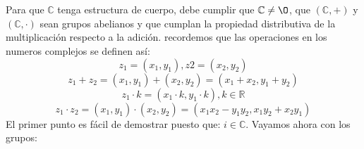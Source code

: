 \documentclass[12pt,a4paper,oneside,onecolumn]{article}
\begin{document}
    \section{}
    Para que $\mathbb{C}$ tenga estructura de cuerpo, debe cumplir que $ \mathbb{C} \ne \O $, que $(\mathbb{C}, +)$ y $(\mathbb{C}, \cdot)$ sean grupos abelianos y que cumplan la propiedad distributiva de la multiplicaci\'on respecto a la adici\'on.
    \newline recordemos que las operaciones en los numeros complejos se definen as\'i: 
    \[
        z_1 = (x_1, y_1), z2 = (x_2, y_2)
    \]
    \[
        z_1 + z_2 = (x_1, y_1) + (x_2, y_2) = (x_1 + x_2, y_1 + y_2)
    \]
    \[
        z_1 \cdot k = (x_1\cdot k, y_1\cdot k), k \in \mathbb{R}
    \]
    \[
        z_1 \cdot z_2 = (x_1, y_1) \cdot (x_2, y_2) = (x_1x_2 - y_1y_2, x_1y_2 + x_2y_1)
    \]
    El primer punto es f\'acil de demostrar puesto que: $i\in	\mathbb{C}$.
    Vayamos ahora con los grupos:
\end{document}
